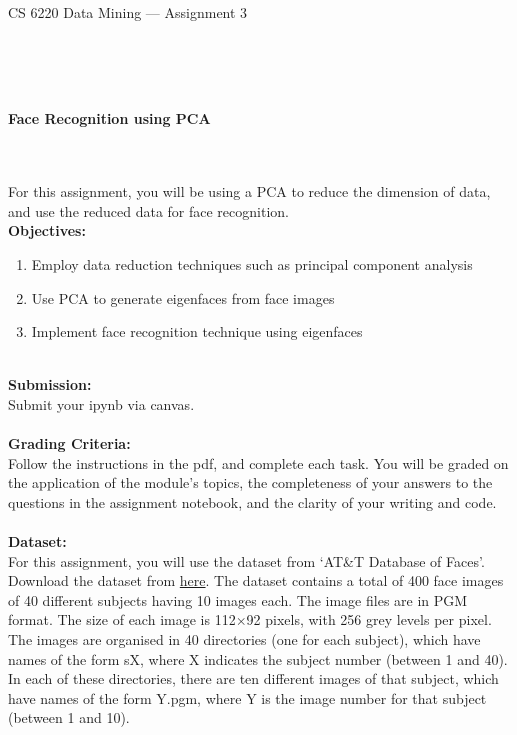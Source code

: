 \documentclass[letter-paper,12pt]{article} %
\begin{document}

\begin{center}
\begin{Huge}
CS 6220 Data Mining --- Assignment 3
\end{Huge}
\end{center}

\hline
\hline
~\\~\\~\\

\begin{center}
\begin{Large}
\textbf{Face Recognition using PCA}
\end{Large}
\end{center}
~\\~\\

For this assignment, you will be using a PCA to reduce the dimension of data, and use the reduced data for face recognition. \\

\textbf{Objectives:}
\begin{enumerate}
    \item Employ data reduction techniques such as principal component analysis
    \item Use PCA to generate eigenfaces from face images
    \item Implement face recognition technique using eigenfaces
\end{enumerate}
~\\
\textbf{Submission:}\\
Submit your ipynb via canvas.\\~\\


\textbf{Grading Criteria:}\\
Follow the instructions in the pdf, and complete each task. You will be graded on the application of the module’s topics, the completeness of your answers to the questions in the assignment notebook, and the clarity of your writing and code.\\~\\

\textbf{Dataset:}\\
For this assignment, you will use the dataset from `AT\&T Database of Faces'. Download the dataset from \href{https://www.kaggle.com/datasets/kasikrit/att-database-of-faces?resource=download}{here}.
The dataset contains a total of 400 face images of 40 different subjects having 10 images each. The image files are in PGM format. The size of each image is 112$\times$92 pixels, with 256 grey levels per pixel. The images are organised in 40 directories (one for each subject), which have names of the form sX, where X indicates the subject number (between 1 and 40). In each of these directories, there are ten different images of that subject, which have names of the form Y.pgm, where Y is the image number for that subject (between 1 and 10).
\end{document}
